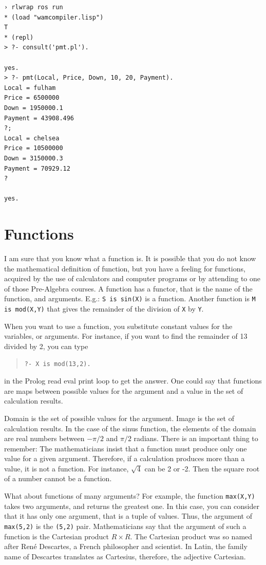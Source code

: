 \documentclass[a4paper,12pt]{book}
\begin{document}
\begin{verbatim}
› rlwrap ros run
* (load "wamcompiler.lisp")
T
* (repl)
> ?- consult('pmt.pl').

yes.
> ?- pmt(Local, Price, Down, 10, 20, Payment).
Local = fulham
Price = 6500000
Down = 1950000.1
Payment = 43908.496
?;
Local = chelsea
Price = 10500000
Down = 3150000.3
Payment = 70929.12
?

yes.
\end{verbatim}

\section{Functions}
I am sure that you know what a function is. It is
possible that you do not know the mathematical
definition of function, but you have a feeling
for functions, acquired by the use of calculators
and computer programs or by attending to one of
those Pre-Algebra courses. A function has a functor,
that is the name of the function, and arguments.
E.g.: \verb|S is sin(X)| is a function. Another
function is \verb|M is mod(X,Y)| that gives the
remainder of the division of \verb|X| by \verb|Y|.

When you want to use a function, you substitute
constant values for the variables, or arguments.
For instance, if you want to find the remainder
of 13 divided by 2, you can type
\begin{quote}
	\verb|?- X is mod(13,2).|
\end{quote}
in the Prolog read eval print loop to get the
answer. One could say that functions are maps
between possible values for the argument and
a value in the set of calculation results.

Domain is the set of possible values for the
argument. Image is the set of calculation
results. In the case of the sinus function,
the elements of the domain are real numbers
between $-\pi/2$ and $\pi/2$ radians. There
is an important thing to remember: The
mathematicians insist that a function must produce
only one value for a given argument. Therefore,
if a calculation produces more than a value,
it is not a function. For instance, $\sqrt{4}$
can be 2 or -2. Then the square root of a number
cannot be a function. 

What about functions of many arguments? For example,
the function \verb|max(X,Y)| takes two arguments,
and returns the greatest one. In this case, you can
consider that it has only one argument, that is a
tuple of values. Thus, the argument of \verb|max(5,2)|
is the \verb|(5,2)| pair. Mathematicians say that the
argument of such a function is the Cartesian product
$R\times R$. The Cartesian product was so named after
René Descartes, a French philosopher and scientist.
In Latin, the family name of Descartes translates
as Cartesius, therefore, the adjective Cartesian.
\end{document}
